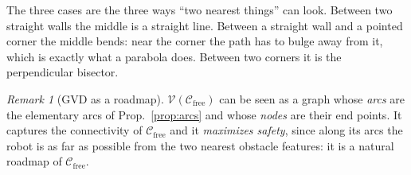 \documentclass[11pt,a4paper]{article}
\newcommand{\Cfree}{\mathcal{C}_{\mathrm{free}}}
\newcommand{\Vor}{\mathcal{V}}
\theoremstyle{definition}
\theoremstyle{plain}
\theoremstyle{remark}
\newtheorem{remark}[definition]{Remark}
\begin{document}
\begin{intuition}
The three cases are the three ways ``two nearest things'' can look. Between two straight walls the middle is a straight line. Between a straight wall and a pointed corner the middle bends: near the corner the path has to bulge away from it, which is exactly what a parabola does. Between two corners it is the perpendicular bisector.
\end{intuition}

\begin{remark}[GVD as a roadmap]
$\Vor(\Cfree)$ can be seen as a graph whose \emph{arcs} are the elementary arcs of Prop.~\ref{prop:arcs} and whose \emph{nodes} are their end points. It captures the connectivity of $\Cfree$ and it \emph{maximizes safety}, since along its arcs the robot is as far as possible from the two nearest obstacle features: it is a natural roadmap of $\Cfree$.
\end{remark}
\end{document}
